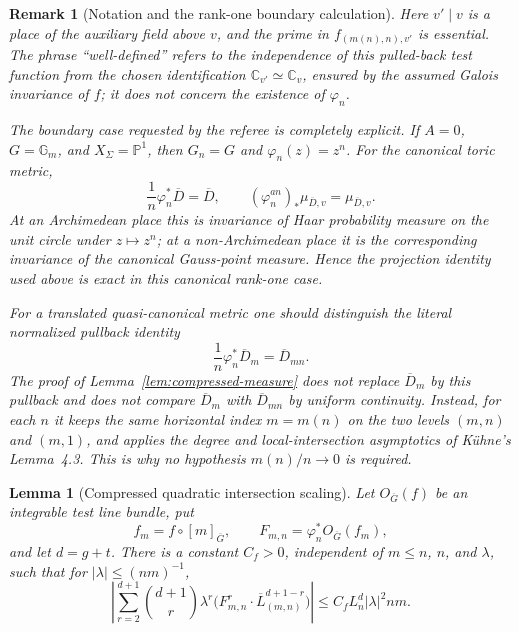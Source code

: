 \documentclass[10pt,a4paper]{amsart}
\theoremstyle{plain}
\newtheorem{lemma}[theorem]{Lemma}
\newtheorem{remark}[theorem]{Remark}
\theoremstyle{plain}
\numberwithin{equation}{section}
\providecommand{\ol}{\overline}
\begin{document}
\begin{remark}[Notation and the rank-one boundary calculation]
	\label{rem:compressed-measure-rank-one-check}
	Here \(v'\mid v\) is a place of the auxiliary field above \(v\), and the prime
	in \(f_{(m(n),n),v'}\) is essential.  The phrase ``well-defined'' refers to
	the independence of this pulled-back test function from the chosen
	identification \(\mathbb C_{v'}\simeq\mathbb C_v\), ensured by the assumed
	Galois invariance of \(f\); it does not concern the existence of
	\(\varphi_n\).
	
	The boundary case requested by the referee is completely explicit.  If
	\(A=0\), \(G=\mathbb G_m\), and \(X_\Sigma=\mathbb P^1\), then
	\(G_n=G\) and \(\varphi_n(z)=z^n\).  For the canonical toric metric,
	\[
	\frac1n\varphi_n^*\overline D=\overline D,
	\qquad
	(\varphi_n^{an})_*\mu_{\overline D,v}=\mu_{\overline D,v}.
	\]
	At an Archimedean place this is invariance of Haar probability measure on the
	unit circle under \(z\mapsto z^n\); at a non-Archimedean place it is the
	corresponding invariance of the canonical Gauss-point measure.  Hence the
	projection identity used above is exact in this canonical rank-one case.
	
	For a translated quasi-canonical metric one should distinguish the literal
	normalized pullback identity
	\[
	\frac1n\varphi_n^*\overline D_m=\overline D_{mn}.
	\]
	The proof of Lemma~\ref{lem:compressed-measure} does not replace
	\(\overline D_m\) by this pullback and does not compare \(\overline D_m\) with
	\(\overline D_{mn}\) by uniform continuity.  Instead, for each \(n\) it keeps
	the same horizontal index \(m=m(n)\) on the two levels
	\((m,n)\) and \((m,1)\), and applies the degree and local-intersection
	asymptotics of K\"uhne's Lemma~4.3.  This is why no hypothesis
	\(m(n)/n\to0\) is required.
\end{remark}

\begin{lemma}[Compressed quadratic intersection scaling]
	\label{lem:compressed-quadratic-scaling}
	Let \(O_{\ol G}(f)\) be an integrable test line bundle, put
	\[
	f_m=f\circ[m]_{\ol G},
	\qquad
	F_{m,n}=\varphi_n^*O_{\ol G}(f_m),
	\]
	and let \(d=g+t\).  There is a constant \(C_f>0\), independent of
	\(m\le n\), \(n\), and \(\lambda\), such that for
	\(|\lambda|\le (nm)^{-1}\),
	\[
	\left|
	\sum_{r=2}^{d+1}
	\binom{d+1}{r}\lambda^r
	\bigl(F_{m,n}^r\cdot\ol L_{(m,n)}^{d+1-r}\bigr)
	\right|
	\le
	C_f L_n^d |\lambda|^2nm .
	\]
\end{lemma}
\end{document}
